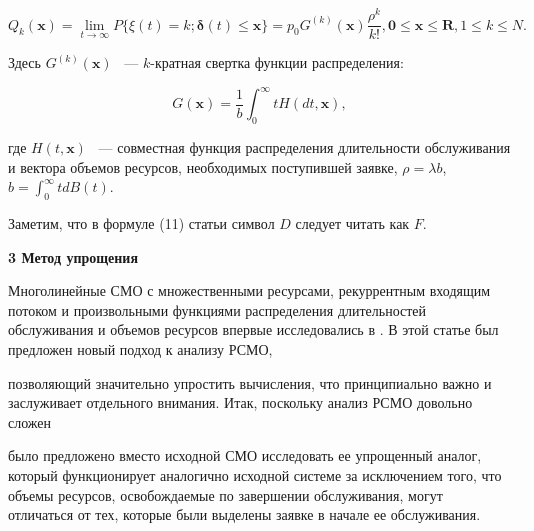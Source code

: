 \documentclass[a4paper,12pt]{article}
\begin{document}
\begin{equation}

Q_k(\mathbf{x})=\lim_{t\rightarrow \infty}P\{ \xi(t)=k; \boldsymbol{\delta}(t)\leq \mathbf{x}\}=p_0G^{(k)}(\mathbf{x}) \frac{\rho^{k}}{k!}, \mathbf{0}\leq \mathbf{x} \leq \mathbf{R}, 1\leq k \leq N.

\end{equation}

Здесь $G^{(k)}(\mathbf{x})$ ~--- $k$-кратная свертка функции распределения:

\begin{equation}

G(\mathbf{x})=\frac{1}{b}\int_{0}^{\infty}tH(dt,\mathbf{x}),

\end{equation}

где $H(t,\mathbf{x})$ ~--- совместная функция распределения длительности обслуживания и вектора объемов ресурсов, необходимых поступившей заявке, $\rho=\lambda b$, $b=\int_{0}^{\infty}tdB(t)$.

Заметим, что в формуле (11) статьи \cite{Naumov_18_2016} символ $D$ следует читать как $F$.



\vspace{\baselineskip}     %




\noindent

\textbf{3 Метод упрощения}



Многолинейные СМО с множественными ресурсами, рекуррентным входящим потоком и произвольными функциями распределения длительностей обслуживания и объемов ресурсов впервые исследовались в \cite{Naumov_1_2014}. В этой статье был предложен новый подход к анализу РСМО,

позволяющий значительно упростить вычисления, что принципиально важно и заслуживает отдельного внимания. Итак, поскольку анализ РСМО довольно сложен


было предложено вместо исходной СМО исследовать ее упрощенный аналог, который функционирует аналогично исходной системе за исключением того, что объемы ресурсов, освобождаемые по завершении обслуживания, могут отличаться от тех, которые были выделены заявке в начале ее обслуживания.
\end{document}
